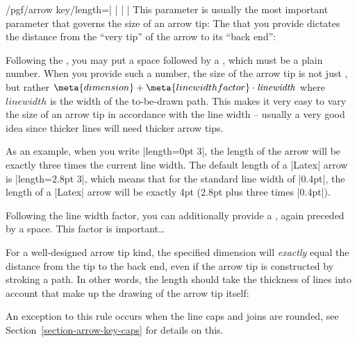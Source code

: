 \begin{key}{/pgf/arrow key/length=| |%
    | |}
  This parameter is usually the most important parameter that governs
  the size of an arrow tip: The  that you provide
  dictates the distance from the ``very tip'' of the arrow to its
  ``back end'':
\begin{codeexample}[]
\end{codeexample}

  Following the , you may put a space followed by a
  , which must be a plain number. When you
  provide such a number, the size of the arrow tip is not just
  , but rather $\meta{dimension} + \meta{line width
    factor}\cdot\mathit{linewidth}$ where $\mathit{linewidth}$ is the
  width of the to-be-drawn path. This makes it very easy to vary the
  size of an arrow tip in accordance with the line width -- usually a
  very good idea since thicker lines will need thicker arrow tips.

  As an example, when you write |length=0pt 3|, the length of the
  arrow will be exactly three times the current line width. The
  default length of a |Latex| arrow is |length=2.8pt 3|, which means
  that for the standard line width of |0.4pt|, the length of a |Latex|
  arrow will be exactly 4pt (2.8pt plus three times |0.4pt|).

  Following the line width factor, you can additionally provide a
  , again preceded by a space. This factor is
  important\dots

  For a well-designed arrow tip kind, the specified dimension will
  \emph{exactly} equal the distance from the tip to the back end, even
  if the arrow tip is constructed by stroking a path. In other words,
  the length should take the thickness of lines into account that make
  up the drawing of the arrow tip itself:
\begin{codeexample}[]
\end{codeexample}
  An exception to this rule occurs when the line caps and joins are
  rounded, see Section~\ref{section-arrow-key-caps} for details on
  this. 
\end{key}


